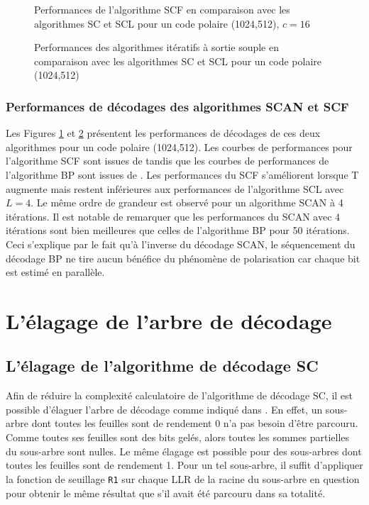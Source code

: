 \begin{figure}[h]
  \centering
  
  \caption{Performances de l'algorithme SCF en comparaison avec les algorithmes SC et SCL pour un code polaire (1024,512), $c=16$}
  \label{fig:scf}
\end{figure}
\begin{figure}[h]
  \centering
  
  \caption{Performances des algorithmes itératifs à sortie souple en comparaison avec les algorithmes SC et SCL pour un code polaire (1024,512)}
  \label{fig:bp_scan}
\end{figure}
\subsubsection{Performances de décodages des algorithmes SCAN et SCF}
Les Figures \ref{fig:scf} et \ref{fig:bp_scan} présentent les performances de décodages de ces deux algorithmes pour un code polaire (1024,512). Les courbes de performances pour l'algorithme SCF sont issues de \cite{afisiadis_low-complexity_2014} tandis que les courbes de performances de l'algorithme BP sont issues de \cite{pamuk_fpga_2011}. Les performances du SCF s'améliorent lorsque T augmente mais restent inférieures aux performances de l'algorithme SCL avec $L=4$. Le même ordre de grandeur est observé pour un algorithme SCAN à 4 itérations. Il est notable de remarquer que les performances du SCAN avec 4 itérations sont bien meilleures que celles de l'algorithme BP pour 50 itérations. Ceci s'explique par le fait qu'à l'inverse du décodage SCAN, le séquencement du décodage BP ne tire aucun bénéfice du phénomène de polarisation car chaque bit est estimé en parallèle.

\section{L'élagage de l'arbre de décodage}


\subsection{L'élagage de l'algorithme de décodage SC}
Afin de réduire la complexité calculatoire de l'algorithme de décodage SC, il est possible d'élaguer l'arbre de décodage comme indiqué dans \cite{alamdar-yazdi_simplified_2011}. En effet, un sous-arbre dont toutes les feuilles sont de rendement 0 n'a pas besoin d'être parcouru. Comme toutes ses feuilles sont des bits gelés, alors toutes les sommes partielles du sous-arbre sont nulles. Le même élagage est possible pour des sous-arbres dont toutes les feuilles sont de rendement 1. Pour un tel sous-arbre, il suffit d'appliquer la fonction de seuillage \texttt{R1} sur chaque LLR de la racine du sous-arbre en question pour obtenir le même résultat que s'il avait été parcouru dans sa totalité.

